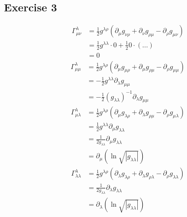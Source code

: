 \subsection{Exercise 3}
\begin{align}
    \Gamma^\lambda_{\mu\nu} &= \frac{1}{2}g^{\lambda\rho} \left(\partial_\mu g_{\nu\rho} + \partial_\nu g_{\rho\mu} - \partial_\rho g_{\mu\nu} \right) \\
    &= \frac{1}{2}g^{\lambda\lambda} \cdot 0 + \frac{1}{2} 0 \cdot \left( \dots \right) \\
    &= 0
\end{align}
\begin{align}
    \Gamma^\lambda_{\mu\mu} &= \frac{1}{2} g^{\lambda\rho} \left(\partial_\mu g_{\mu\rho} + \partial_\mu g_{\rho\mu} - \partial_\rho g_{\mu\mu} \right) \\
    &= - \frac{1}{2} g^{\lambda\lambda} \partial_\lambda g_{\mu\mu} \\
    &= -\frac{1}{2} \left(g_{\lambda\lambda}\right)^{-1} \partial_\lambda g_{\mu\mu}
\end{align}
\begin{align}
    \Gamma^\lambda_{\mu\lambda} &= \frac{1}{2} g^{\lambda\rho} \left(\partial_\mu g_{\lambda\rho} + \partial_\lambda g_{\rho\mu} - \partial_\rho g_{\mu\lambda} \right) \\
    &= \frac{1}{2}g^{\lambda\lambda}\partial_\mu g_{\lambda\lambda} \\
    &= \frac{1}{2 g_{\lambda\lambda}} \partial_\mu g_{\lambda\lambda} \\
    &= \partial_\mu \left(\ln{\sqrt{\left|g_{\lambda\lambda}\right|}}\right)
\end{align}
\begin{align}
    \Gamma^\lambda_{\lambda\lambda} &= \frac{1}{2} g^{\lambda\rho} \left( \partial_\lambda g_{\lambda\rho} + \partial_\lambda g_{\rho\lambda} - \partial_\rho g_{\lambda\lambda} \right) \\
    &= \frac{1}{2g_{\lambda\lambda}} \partial_\lambda g_{\lambda\lambda} \\
    &= \partial_\lambda \left(\ln{\sqrt{\left|g_{\lambda\lambda}\right|}}\right)
\end{align}